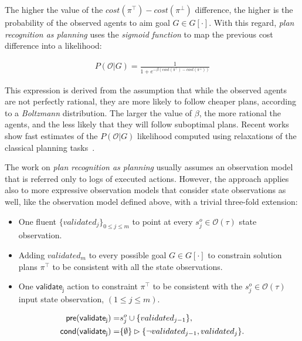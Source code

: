 \documentclass{article}
\newcommand{\pre}{\mathsf{pre}}     %
\newcommand{\cond}{\mathsf{cond}}   %
\begin{document}
The higher the value of the $cost(\pi^\top)-cost(\pi^\bot)$ difference, the higher is the probability of the observed agents to aim goal $G\in G[\cdot]$. With this regard, {\em plan recognition as planning} uses the {\em sigmoid function} to map the previous cost difference into a likelihood:

\begin{align}
P(\mathcal{O}|G) = \frac{1}{1+e^{-\beta(cost(\pi^\top)-cost(\pi^\bot))}}
\end{align}

This expression is derived from the assumption that while the observed agents are not perfectly rational, they are more likely to follow cheaper plans, according to a {\em Boltzmann} distribution. The larger the value of $\beta$, the more rational the agents, and the less likely that they will follow suboptimal plans. Recent works show fast estimates of the $P(\mathcal{O}|G)$ likelihood computed using relaxations of the classical planning tasks~\cite{pereira2017landmark}.

The work on {\em plan recognition as planning} usually assumes an observation model that is referred only to logs of executed actions. However, the approach applies also to more expressive observation models that consider state observations as well, like the observation model defined above, with a trivial three-fold extension:
\begin{itemize}
\item One fluent $\{validated_j\}_{0\leq j\leq m}$ to point at every $s_j^o\in\mathcal{O}(\tau)$ state observation.
\item Adding $validated_m$ to every possible goal $G\in G[\cdot]$ to constrain solution plans $\pi^\top$ to be consistent with all the state observations.
\item One $\mathsf{validate_{j}}$ action to constraint $\pi^\top$ to be consistent with the $s_j^o\in\mathcal{O}(\tau)$ input state observation, {\small $(1\leq j\leq m)$}.  
\end{itemize}
\begin{small}
\begin{align*}
\hspace*{7pt}\pre(\mathsf{validate_{j}})=&s_j^o\cup\{validated_{j-1}\},\\
\cond(\mathsf{validate_{j}})=&\{\emptyset\}\rhd\{\neg validated_{j-1}, validated_j\}.
\end{align*}
\end{small}
\end{document}
